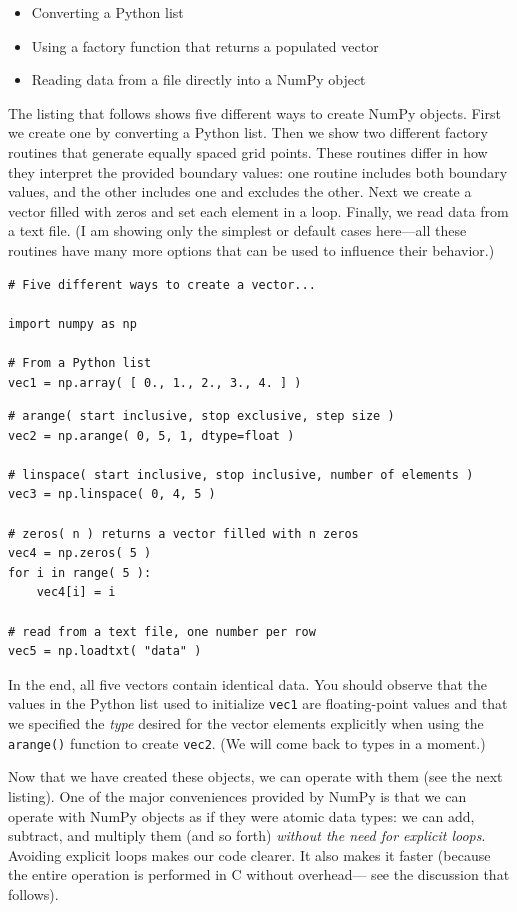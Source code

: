 \begin{itemize}
\item Converting a Python list
\item Using a factory function that returns a populated vector
\item Reading data from a file directly into a NumPy object
\end{itemize}

The listing that follows shows five different ways to create NumPy
objects.  First we create one by converting a Python list. Then we
show two different factory routines that generate equally spaced grid
points.  These routines differ in how they interpret the provided
boundary values: one routine includes both boundary values, and the
other includes one and excludes the other. Next we create a vector
filled with zeros and set each element\vadjust{\pagebreak} in a loop. Finally, we read
data from a text file.  (I am showing only the simplest or default
cases here---all these routines have many more options that can be
used to influence their behavior.)

\begin{verbatim}
# Five different ways to create a vector...

import numpy as np

# From a Python list
vec1 = np.array( [ 0., 1., 2., 3., 4. ] )
\end{verbatim}

\begin{verbatim}
# arange( start inclusive, stop exclusive, step size )
vec2 = np.arange( 0, 5, 1, dtype=float )

# linspace( start inclusive, stop inclusive, number of elements )
vec3 = np.linspace( 0, 4, 5 )

# zeros( n ) returns a vector filled with n zeros
vec4 = np.zeros( 5 )
for i in range( 5 ):
    vec4[i] = i

# read from a text file, one number per row
vec5 = np.loadtxt( "data" )
\end{verbatim}

In the end, all five vectors contain identical data.  You should
observe that the values in the Python list used to initialize
\texttt{vec1} are floating-point values and that we specified the
\emph{type} desired for the vector elements explicitly when using the
\texttt{arange()} function to create \texttt{vec2}. (We will come back
to types in a moment.)

Now that we have created these objects, we can operate with them (see
the next listing). One of the major conveniences provided by NumPy is
that we can operate with NumPy objects as if they were atomic data
types: we can add, subtract, and multiply them (and so forth)
\emph{without the need for explicit loops}. Avoiding explicit loops
makes our code clearer. It also makes it faster (because the entire
operation is performed in C without overhead--- see the discussion that
follows).

